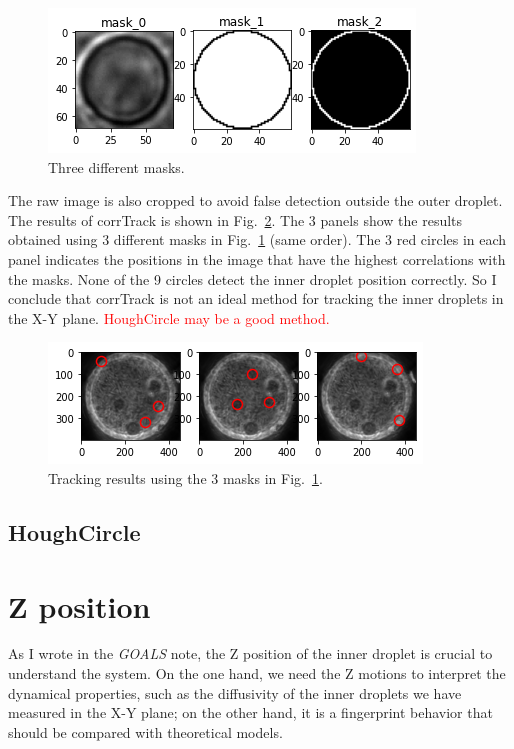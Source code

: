 \documentclass[onecolumn,aps, pre,amsmath,amssymb,longbibliography,12pt]{revtex4-2}
\begin{document}
\begin{figure}[h]
  \includegraphics{3-masks.png}
  \caption{Three different masks.}
  \label{fig:3-masks}
\end{figure}

The raw image is also cropped to avoid false detection outside the outer droplet.
The results of corrTrack is shown in Fig.~\ref{fig:3-mask-results}.
The 3 panels show the results obtained using 3 different masks in Fig.~\ref{fig:3-masks} (same order).
The 3 red circles in each panel indicates the positions in the image that have the highest correlations with the masks.
None of the 9 circles detect the inner droplet position correctly.
So I conclude that corrTrack is not an ideal method for tracking the inner droplets in the X-Y plane.
\textcolor{red}{HoughCircle may be a good method.}

\begin{figure}[h]
  \includegraphics{3-mask-results.png}
  \caption{Tracking results using the 3 masks in Fig.~\ref{fig:3-masks}.}
  \label{fig:3-mask-results}
\end{figure}

\subsection{HoughCircle}



\section{Z position}
As I wrote in the \textit{GOALS} note, the Z position of the inner droplet is crucial to understand the system.
On the one hand, we need the Z motions to interpret the dynamical properties, such as the diffusivity of the inner droplets we have measured in the X-Y plane;
on the other hand, it is a fingerprint behavior that should be compared with theoretical models.
\end{document}
